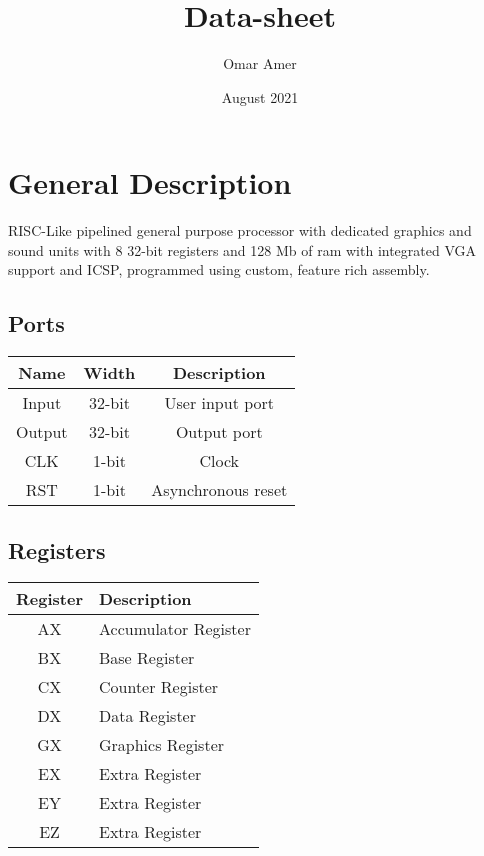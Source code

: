 \documentclass[a4paper, 11pt]{report}
\title{Data-sheet}
\author{Omar Amer}
\date{August 2021}
\begin{document}
\maketitle


\section{General Description}
RISC-Like pipelined general purpose processor with dedicated graphics and sound units with 8 32-bit registers and 128 Mb of ram with integrated VGA support and ICSP, programmed using custom, feature rich assembly.
\subsection{Ports}
\begin{center}
    \begin{tabular}{|c|c|c|}
        \hline
        Name   & Width  & Description        \\
        \hline
        Input  & 32-bit & User input port    \\
        \hline
        Output & 32-bit & Output port        \\
        \hline
        CLK    & 1-bit  & Clock              \\
        \hline
        RST    & 1-bit  & Asynchronous reset \\
        \hline
    \end{tabular}
\end{center}
\subsection{Registers}
\begin{center}
    \begin{tabular}{|c|l|}
        \hline
        Register & Description          \\
        \hline
        AX       & Accumulator Register \\
        \hline
        BX       & Base Register        \\
        \hline
        CX       & Counter Register     \\
        \hline
        DX       & Data Register        \\
        \hline
        GX       & Graphics Register    \\
        \hline
        EX       & Extra Register       \\
        \hline
        EY       & Extra Register       \\
        \hline
        EZ       & Extra Register       \\
        \hline
    \end{tabular}
\end{center}
\end{document}
